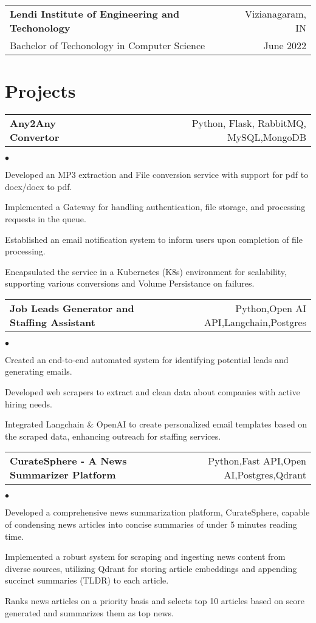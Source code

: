 \documentclass[margin, 11pt]{res}
\makeatletter
\newcommand{\resumeSubheading}[4]{

\begin{tabular*}{1.01\textwidth}{@{\hspace{-4pt}}l @{\extracolsep{\fill}} r}
\textbf{#1} & #2 \\
      {#3} &  {#4}
\end{tabular*}\vspace{-2pt}
}
\newcommand{\resumeSubSubheading}[2]{
\begin{tabular*}{1.01\textwidth}{@{\hspace{-4pt}}l @{\extracolsep{\fill}} r}
    #1 & #2 
\end{tabular*}\vspace{-7pt}
}
\newenvironment{list2}{
	\begin{list}{$\bullet$}{%
	    \small
		\setlength{\itemsep}{0in}
		\setlength{\parsep}{0in} \setlength{\parskip}{0in}
		\setlength{\topsep}{0in} \setlength{\partopsep}{0in}
		\setlength{\leftmargin}{0.2in}}}{\end{list}}
\makeatother
\begin{document}
\begin{resume}
\vspace{2pt}

\resumeSubheading{Lendi Institute of Engineering and Techonology}{Vizianagaram, IN}
             {Bachelor of Techonology in Computer Science}{June 2022}

\section{\sc Projects}

\resumeSubSubheading{\textbf{Any2Any Convertor}}
{Python, Flask, RabbitMQ, MySQL,MongoDB}

\begin{list2}
\item {Developed an MP3 extraction and File conversion service with support for pdf to docx/docx to pdf.}
        \item {Implemented a Gateway for handling authentication, file storage, and processing requests in the queue.}
        \item {Established an email notification system to inform users upon completion of file processing.}
        \item {Encapsulated the service in a Kubernetes (K8s) environment for scalability, supporting various conversions and Volume Persistance on failures.}
\end{list2}

\resumeSubSubheading{\textbf{Job Leads Generator and Staffing Assistant}}
{Python,Open AI API,Langchain,Postgres}

\begin{list2}
        \item Created an end-to-end automated system for identifying potential leads and generating emails.
        \item Developed web scrapers to extract and clean data about companies with active hiring needs.
        \item Integrated Langchain \& OpenAI to create personalized email templates based on the scraped data, enhancing outreach for staffing services.
\end{list2}

\resumeSubSubheading{\textbf{CurateSphere - A News Summarizer Platform}}
{Python,Fast API,Open AI,Postgres,Qdrant}

\begin{list2}
    \item Developed a comprehensive news summarization platform, CurateSphere, capable of condensing news articles into concise summaries of under 5 minutes reading time.
    \item Implemented a robust system for scraping and ingesting news content from diverse sources, utilizing Qdrant for storing article embeddings and appending succinct summaries (TLDR) to each article.
    \item Ranks news articles on a priority basis and selects top 10 articles based on score generated and summarizes them as top news.
\end{list2}


\end{resume}
\end{document}
